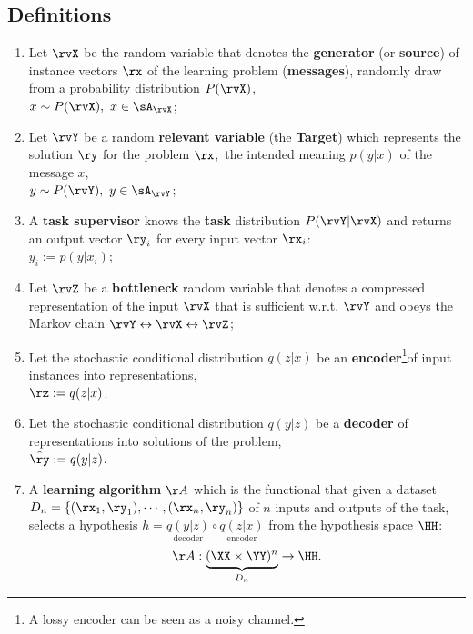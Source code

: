     \subsection{Definitions}
    \begin{enumerate}
      \item Let $\rvX$ be the random variable that denotes the
       \textbf{generator} (or \textbf{source}) of instance vectors $\rx$ of the learning problem  (\textbf{messages}), randomly draw from a probability distribution \(P(\rvX)\),\\ \(x\sim P(\rvX),~ x \in \sA_{\rvX} \);
       \item Let $\rvY$ be a random \textbf{relevant variable}  (the \textbf{Target}) which represents the solution $\ry$ for the problem $\rx$,~\ie the intended meaning $p(y|x)$ of the message $x$,\\
       \(y\sim P(\rvY),~ y \in \sA_{\rvY} \);
      \item A \textbf{task supervisor} knows the \textbf{task} distribution $P(\rvY|\rvX)$ and returns an output vector \(\ry_i\) for every input vector \(\rx_i\):\\
      $y_i := p(y|x_i)$;
      \item Let $\rvZ$ be a \textbf{bottleneck} random variable that denotes a compressed representation of the input $\rvX$ that is sufficient w.r.t. $\rvY$ and obeys the Markov chain $\rvY \leftrightarrow \rvX \leftrightarrow \rvZ$;
      \item Let the stochastic conditional distribution $q(z|x)$ be an \textbf{encoder}\footnote{A lossy encoder can be seen as a noisy channel.}of input instances into representations,\\
      $\rz := q(z|x)$.
      \item Let the stochastic conditional distribution $q(y|z)$ be a \textbf{decoder} of representations into solutions of the problem,\\
      $\hat{\ry} := q(y|z)$.
      \item A \textbf{learning algorithm} \(\AA\) which is the functional that given a dataset \(D_n = \{(\rx_1,\ry_1), \cdots, (\rx_n, \ry_n)\}\) of $n$ inputs and outputs of the task, selects a hypothesis \(h = \underset{\text{decoder}}{q(y|z)} \circ \underset{\text{encoder}}{q(z|x)} \) from the hypothesis space \(\HH\):
      \begin{align}
        \AA: \underbrace{(\XX \times \YY)^n}_{D_n} \to \HH .
      \end{align}
    \end{enumerate}

